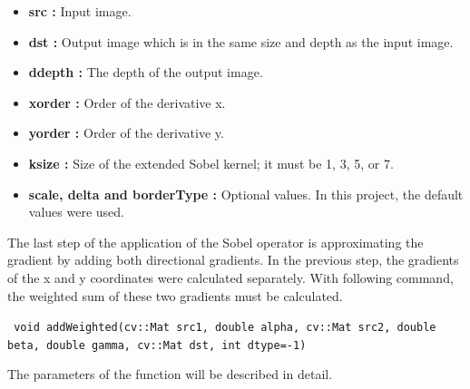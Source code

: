   \begin{itemize}

\item \textbf{src : }Input image.

\item \textbf{dst : }Output image which is in the same size and depth as the input image.

\item \textbf{ddepth : }The depth of the output image.

\item \textbf{xorder : }Order of the derivative x.

\item \textbf{yorder : }Order of the derivative y.

\item \textbf{ksize : }Size of the extended Sobel kernel; it must be 1, 3, 5, or 7.

\item \textbf{scale, delta and borderType : }Optional values. In this project, the default values were used.

  \end{itemize}

The last step of the application of the Sobel operator is approximating the gradient by adding both directional gradients. In the previous step, the gradients of the x and y coordinates were calculated separately. With following command, the weighted sum of these two gradients must be calculated.\cite{addWeighted}

 \begin{center}
 
\texttt{ void addWeighted(cv::Mat src1, double alpha, cv::Mat src2, double beta, double gamma, cv::Mat dst, int dtype=-1)}
 
  \end{center}
  
  The parameters of the function will be described in detail.
  
